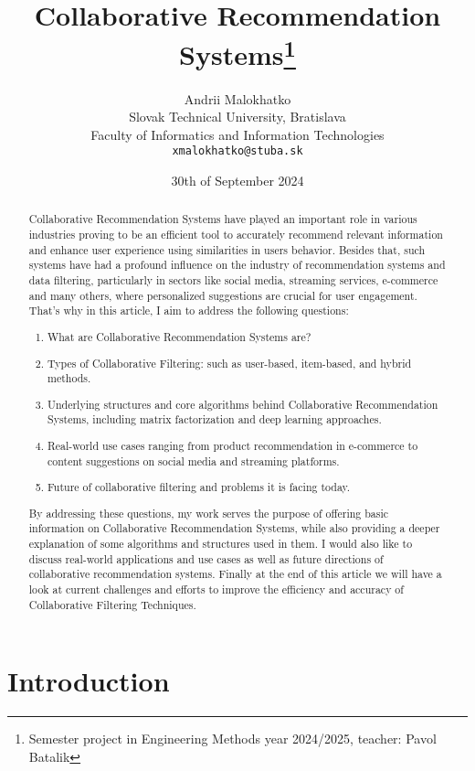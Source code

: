 \documentclass[10pt,a4paper]{article}
\title{Collaborative Recommendation Systems\thanks{Semester project in Engineering Methods year 2024/2025, teacher: Pavol Batalik}}
\author{Andrii Malokhatko\\[2pt]
	{\small Slovak Technical University, Bratislava}\\
	{\small Faculty of Informatics and Information Technologies}\\
	{\small \texttt{xmalokhatko@stuba.sk}}
	}
\date{\small 30th of September 2024}
\begin{document}
\maketitle

\begin{abstract}

Collaborative Recommendation Systems have played an important role in various industries proving to be an efficient tool to accurately recommend relevant information and enhance user experience using similarities in users behavior. Besides that, such systems have had a profound influence on the industry of recommendation systems and data filtering, particularly in sectors like social media, streaming services,  e-commerce and many others, where personalized suggestions are crucial for user engagement. That's why in this article, I aim to address the following questions:
\begin{enumerate}
\item What are Collaborative Recommendation Systems are?
\item Types of Collaborative Filtering: such as user-based, item-based, and hybrid methods.
\item Underlying structures and core algorithms behind Collaborative Recommendation Systems, including matrix factorization and deep learning approaches.
\item Real-world use cases ranging from product recommendation in e-commerce to content suggestions on social media and streaming platforms.
\item Future of collaborative filtering and problems it is facing today.
\end{enumerate}

By addressing these questions, my work serves the purpose of offering basic information on Collaborative Recommendation Systems, while also providing a deeper explanation of some algorithms and structures used in them. I would also like to discuss real-world applications and use cases as well as future directions of collaborative recommendation systems. Finally at the end of this article we will have a look at current challenges and efforts to improve the efficiency and accuracy of Collaborative Filtering Techniques.
\clearpage
\end{abstract}



\section{Introduction}
\end{document}
